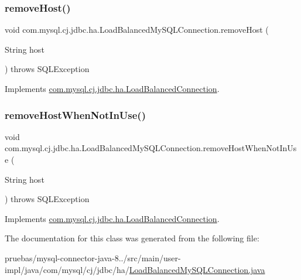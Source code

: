 \subsubsection{\texorpdfstring{remove\+Host()}{removeHost()}}
{\footnotesize\ttfamily void com.\+mysql.\+cj.\+jdbc.\+ha.\+Load\+Balanced\+My\+S\+Q\+L\+Connection.\+remove\+Host (\begin{DoxyParamCaption}\item[{String}]{host }\end{DoxyParamCaption}) throws S\+Q\+L\+Exception}



Implements \mbox{\hyperlink{interfacecom_1_1mysql_1_1cj_1_1jdbc_1_1ha_1_1_load_balanced_connection_a41b452c0ebbd9f7dd3f8a8d6958df670}{com.\+mysql.\+cj.\+jdbc.\+ha.\+Load\+Balanced\+Connection}}.

\mbox{\label{classcom_1_1mysql_1_1cj_1_1jdbc_1_1ha_1_1_load_balanced_my_s_q_l_connection_ad127c1ba70ff4bdba22ad3c70cd1ecff}} 
\subsubsection{\texorpdfstring{remove\+Host\+When\+Not\+In\+Use()}{removeHostWhenNotInUse()}}
{\footnotesize\ttfamily void com.\+mysql.\+cj.\+jdbc.\+ha.\+Load\+Balanced\+My\+S\+Q\+L\+Connection.\+remove\+Host\+When\+Not\+In\+Use (\begin{DoxyParamCaption}\item[{String}]{host }\end{DoxyParamCaption}) throws S\+Q\+L\+Exception}



Implements \mbox{\hyperlink{interfacecom_1_1mysql_1_1cj_1_1jdbc_1_1ha_1_1_load_balanced_connection_a752d8892b856e9acc215aeaa9fe293ef}{com.\+mysql.\+cj.\+jdbc.\+ha.\+Load\+Balanced\+Connection}}.



The documentation for this class was generated from the following file\+:\begin{DoxyCompactItemize}
\item 
pruebas/mysql-\/connector-\/java-\/8../src/main/user-\/impl/java/com/mysql/cj/jdbc/ha/\mbox{\hyperlink{_load_balanced_my_s_q_l_connection_8java}{Load\+Balanced\+My\+S\+Q\+L\+Connection.\+java}}\end{DoxyCompactItemize}
